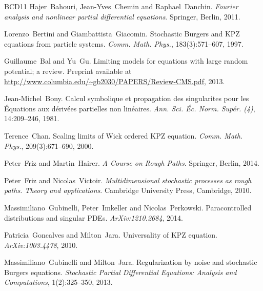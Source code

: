\documentclass[a4paper,11pt]{article}
\newcommand{\tmtextit}[1]{{\itshape{#1}}}
\begin{document}
\begin{thebibliography}{BCD11}
  Hajer~Bahouri, Jean-Yves~Chemin  and 
  Raphael~Danchin.{\newblock} \tmtextit{Fourier analysis and nonlinear partial
  differential equations}.{\newblock} Springer, Berlin, 2011.{\newblock}
  
  Lorenzo~Bertini  and 
  Giambattista~Giacomin.{\newblock} Stochastic Burgers and KPZ equations from
  particle systems.{\newblock} \tmtextit{Comm. Math. Phys.}, 183(3):571--607,
  1997.{\newblock}
  
  Guillaume~Bal  and  Yu~Gu.{\newblock} Limiting
  models for equations with large random potential; a review.{\newblock}
  Preprint available at \url{http://www.columbia.edu/~gb2030/PAPERS/Review-CMS.pdf}, 2013.{\newblock}
  
  Jean-Michel~Bony.{\newblock} Calcul symbolique et
  propagation des singularites pour les {\'E}quations aux d{\'e}riv{\'e}es partielles non lin{\'e}aires.{\newblock}
  \tmtextit{Ann. Sci. {\'E}c. Norm. Sup{\'e}r. (4)}, 14:209--246,
  1981.{\newblock}
  
  Terence~Chan.{\newblock} Scaling limits of Wick
  ordered KPZ equation.{\newblock} \tmtextit{Comm. Math. Phys.},
  209(3):671--690, 2000.{\newblock}
  
  Peter~Friz  and  Martin~Hairer.{\newblock} \tmtextit{A
  Course on Rough Paths}.{\newblock} Springer, Berlin, 2014.{\newblock}
  
  Peter~Friz  and  Nicolas~Victoir.{\newblock}
  \tmtextit{Multidimensional stochastic processes as rough paths. Theory and
  applications}.{\newblock} Cambridge University Press, Cambridge, 2010.{\newblock}
  
  Massimiliano~Gubinelli, Peter~Imkeller  and 
  Nicolas~Perkowski.{\newblock} Paracontrolled distributions and singular
  PDEs.{\newblock} \tmtextit{ArXiv:1210.2684},
  2014.{\newblock}
  
  Patricia~Goncalves  and 
  Milton~Jara.{\newblock} Universality of KPZ equation.{\newblock}
  \tmtextit{ArXiv:1003.4478}, 2010.{\newblock}
  
  Massimiliano~Gubinelli  and 
  Milton~Jara.{\newblock} Regularization by noise and stochastic Burgers
  equations.{\newblock} \tmtextit{Stochastic Partial Differential Equations:
  Analysis and Computations}, 1(2):325--350, 2013.{\newblock}
  

\end{thebibliography}
\end{document}
